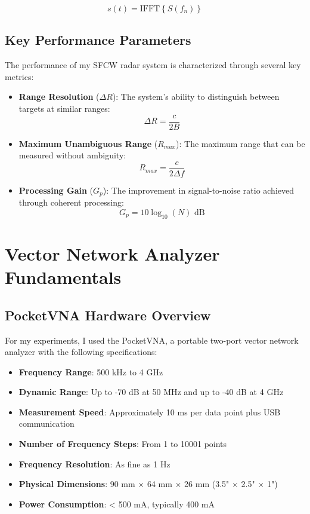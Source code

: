 \documentclass[11pt,a4paper]{article}
\begin{document}
\begin{equation}
    s(t) = \text{IFFT}\left\{ S(f_n) \right\}
\end{equation}

\subsection{Key Performance Parameters}

The performance of my SFCW radar system is characterized through several key metrics:

\begin{itemize}
    \item \textbf{Range Resolution} ($\Delta R$): The system's ability to distinguish between targets at similar ranges:
    \begin{equation}
        \Delta R = \frac{c}{2B}
    \end{equation}
    
    \item \textbf{Maximum Unambiguous Range} ($R_{max}$): The maximum range that can be measured without ambiguity:
    \begin{equation}
        R_{max} = \frac{c}{2\Delta f}
    \end{equation}
    
    \item \textbf{Processing Gain} ($G_p$): The improvement in signal-to-noise ratio achieved through coherent processing:
    \begin{equation}
        G_p = 10\log_{10}(N) \text{ dB}
    \end{equation}
\end{itemize}

\section{Vector Network Analyzer Fundamentals}

\subsection{PocketVNA Hardware Overview}

For my experiments, I used the PocketVNA, a portable two-port vector network analyzer with the following specifications:

\begin{itemize}
    \item \textbf{Frequency Range}: 500 kHz to 4 GHz
    \item \textbf{Dynamic Range}: Up to -70 dB at 50 MHz and up to -40 dB at 4 GHz
    \item \textbf{Measurement Speed}: Approximately 10 ms per data point plus USB communication
    \item \textbf{Number of Frequency Steps}: From 1 to 10001 points
    \item \textbf{Frequency Resolution}: As fine as 1 Hz
    \item \textbf{Physical Dimensions}: 90 mm × 64 mm × 26 mm (3.5" × 2.5" × 1")
    \item \textbf{Power Consumption}: < 500 mA, typically 400 mA
\end{itemize}
\end{document}
